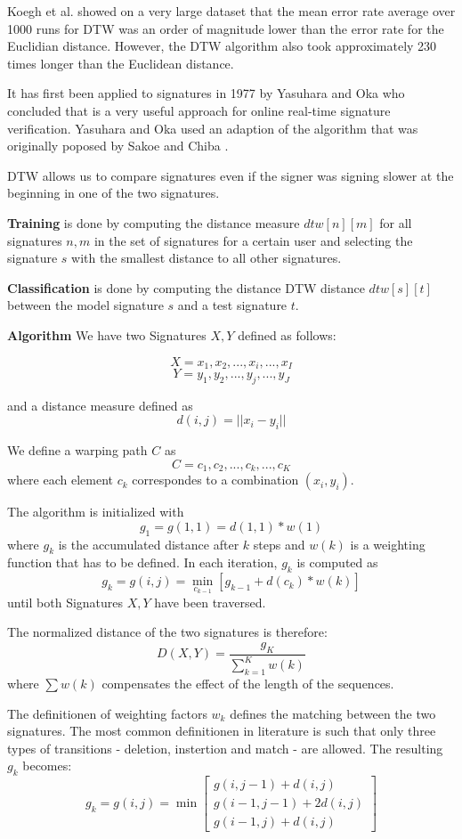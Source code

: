 \documentclass[a4paper, oneside]{csthesis}
\begin{document}
Koegh et al. showed on a very large dataset that the mean error rate average over 1000 runs for DTW was an order of magnitude lower than the error rate for the Euclidian distance. However, the DTW algorithm also took approximately 230 times longer than the Euclidean distance. \cite{Keogh:2002:EID:1287369.1287405}

It has first been applied to signatures in 1977 by Yasuhara and Oka \cite{yasuhara1977DTW} who concluded that is a very useful approach for online real-time signature verification. Yasuhara and Oka used an adaption of the algorithm that was originally poposed by Sakoe and Chiba \cite{1163055}.

DTW allows us to compare signatures even if the signer was signing slower at the beginning in one of the two signatures.

\textbf{Training} is done by computing the distance measure $dtw[n][m]$ for all signatures $n, m$ in the set of signatures for a certain user and selecting the signature $s$ with the smallest distance to all other signatures.

\textbf{Classification} is done by computing the distance DTW distance $dtw[s][t]$ between the model signature $s$ and a test signature $t$.

\textbf{Algorithm} We have two Signatures $X,Y$ defined as follows:

$$X = x_1, x_2, ... , x_i, ... , x_I$$ $$Y = y_1, y_2, ..., y_j, ..., y_J$$

and a distance measure defined as $$d(i,j) = ||x_i - y_i||$$

We define a warping path $C$ as $$ C = c_1, c_2, ..., c_k, ..., c_K $$ where each element $c_k$ correspondes to a combination $(x_i, y_i)$.

The algorithm is initialized with $$g_1 = g(1,1) = d(1,1) * w(1)$$ where $g_k$ is the accumulated distance after $k$ steps and $w(k)$ is a weighting function that has to be defined.
In each iteration, $g_k$ is computed as $$g_k = g(i,j) = \min\limits_{c_{k-1}} [g_{k-1}+d(c_k) * w(k)]$$ until both Signatures $X,Y$ have been traversed.

The normalized distance of the two signatures is therefore: $$D(X,Y) = \frac{g_K}{\sum_{k=1}^K w(k)}$$ where $\sum w(k)$ compensates the effect of the length of the sequences.

The definitionen of weighting factors $w_k$ defines the matching between the two signatures. The most common definitionen in literature is such that only three types of transitions - deletion, instertion and match - are allowed. The resulting $g_k$ becomes: $$g_k = g(i,j) = \min \left[\begin{array}{c}g(i,j-1) + d(i,j) \\g(i-1,j-1)+ 2 d(i,j) \\g(i-1,j) + d(i,j)\end{array}\right]$$
\end{document}

